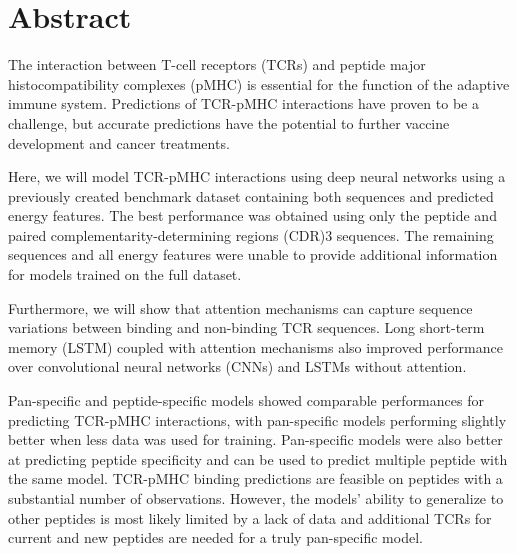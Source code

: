 \section*{Abstract}
The interaction between T-cell receptors (TCRs) and peptide major histocompatibility complexes (pMHC) is essential for the function of the adaptive immune system. Predictions of TCR-pMHC interactions have proven to be a challenge, but accurate predictions have the potential to further vaccine development and cancer treatments. 

Here, we will model TCR-pMHC interactions using deep neural networks using a previously created benchmark dataset containing both sequences and predicted energy features. The best performance was obtained using only the peptide and paired complementarity-determining regions (CDR)3 sequences. The remaining sequences and all energy features were unable to provide additional information for models trained on the full dataset.

Furthermore, we will show that attention mechanisms can capture sequence variations between binding and non-binding TCR sequences. Long short-term memory (LSTM) coupled with attention mechanisms also improved performance over convolutional neural networks (CNNs) and LSTMs without attention.

Pan-specific and peptide-specific models showed comparable performances for predicting TCR-pMHC interactions, with pan-specific models performing slightly better when less data was used for training. Pan-specific models were also better at predicting peptide specificity and can be used to predict multiple peptide with the same model. TCR-pMHC binding predictions are feasible on peptides with a substantial number of observations. However, the models' ability to generalize to other peptides is most likely limited by a lack of data and additional TCRs for current and new peptides are needed for a truly pan-specific model.

